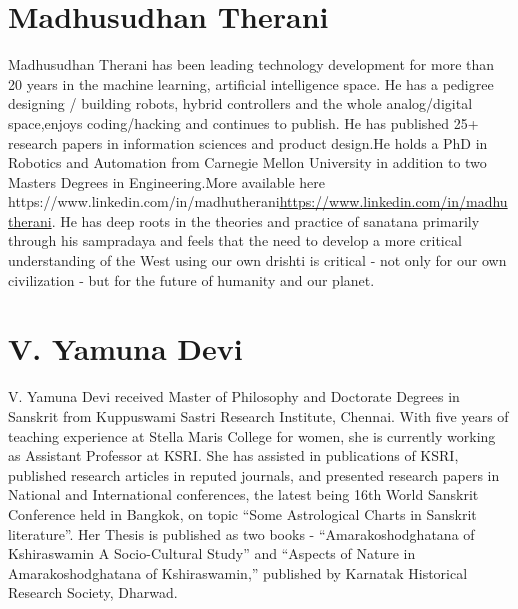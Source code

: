 \section*{Madhusudhan Therani}

Madhusudhan Therani has been leading technology development for more than 20 years in the machine learning, artificial intelligence\break
 space. He has a pedigree designing / building robots, hybrid controllers and the whole analog/digital space,enjoys coding/hacking and continues to publish. He has published 25+ research papers in information sciences and product design.He holds a PhD in Robotics and Automation from Carnegie Mellon University in addition to two Masters Degrees in Engineering.More available here https://www.linkedin.com/in/madhutherani\url{https://www.linkedin.com/in/madhutherani}. He has deep roots in the theories and practice of sanatana primarily through his sampradaya and feels that the need to develop a more critical understanding of the West using our own drishti is critical - not only for our own civilization - but for the future of humanity and our planet.

\section*{V. Yamuna Devi}

V. Yamuna Devi received Master of Philosophy and Doctorate Degrees in Sanskrit from Kuppuswami Sastri Research Institute, Chennai. With five years of teaching experience at Stella Maris College for women, she is currently working as Assistant Professor at KSRI. She has assisted in publications of KSRI, published research articles in reputed journals, and presented research papers in National and International conferences, the latest being 16th World Sanskrit Conference held in Bangkok, on topic “Some Astrological Charts in Sanskrit literature”. Her Thesis is published as two books - “Amarakoshodghatana of Kshiraswamin A Socio-Cultural Study” and “Aspects of Nature in Amarakoshodghatana of Kshiraswamin,” published by Karnatak Historical Research Society, Dharwad.

